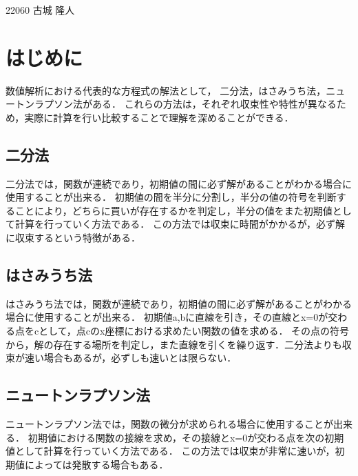 \documentclass[a4paper,11pt]{ltjsarticle}
\begin{document}
\begin{flushright}
    22060 古城 隆人\\
\end{flushright}
\section{はじめに}
数値解析における代表的な方程式の解法として，
二分法，はさみうち法，ニュートンラプソン法がある．
これらの方法は，それぞれ収束性や特性が異なるため，実際に計算を行い比較することで理解を深めることができる．
\subsection{二分法}
二分法では，関数が連続であり，初期値の間に必ず解があることがわかる場合に使用することが出来る．
初期値の間を半分に分割し，半分の値の符号を判断することにより，どちらに買いが存在するかを判定し，半分の値をまた初期値として計算を行っていく方法である．
この方法では収束に時間がかかるが，必ず解に収束するという特徴がある．\cite{nibunhou}
\subsection{はさみうち法}
はさみうち法では，関数が連続であり，初期値の間に必ず解があることがわかる場合に使用することが出来る．
初期値a,bに直線を引き，その直線とx=0が交わる点をcとして，点cのx座標における求めたい関数の値を求める．
その点の符号から，解の存在する場所を判定し，また直線を引くを繰り返す．二分法よりも収束が速い場合もあるが，必ずしも速いとは限らない．\cite{hasamiutihou}
\subsection{ニュートンラプソン法}
ニュートンラプソン法では，関数の微分が求められる場合に使用することが出来る．
初期値における関数の接線を求め，その接線とx=0が交わる点を次の初期値として計算を行っていく方法である．
この方法では収束が非常に速いが，初期値によっては発散する場合もある．\cite{newtonrapsonhou}
\end{document}
